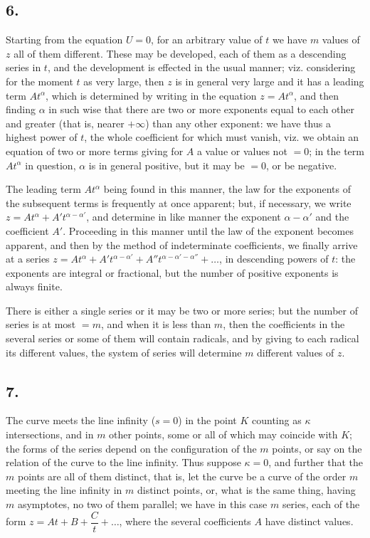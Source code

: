 \documentclass[11pt,a4paper]{book}
\begin{document}
\subsection*{6.}

Starting from the equation $U = 0$, for an arbitrary value of $t$ we have $m$ values of $z$ all of them different. These may be developed, each of them as a descending series in $t$, and the development is effected in the usual manner; viz. considering for the moment $t$ as very large, then $z$ is in general very large and it has a leading term $At^\alpha$, which is determined by writing in the equation $z = At^\alpha$, and then finding $\alpha$ in such wise that there are two or more exponents equal to each other and greater (that is, nearer $+\infty$) than any other exponent: we have thus a highest power of $t$, the whole coefficient for which must vanish, viz. we obtain an equation of two or more terms giving for $A$ a value or values not $= 0$; in the term $At^\alpha$ in question, $\alpha$ is in general positive, but it may be $= 0$, or be negative.

The leading term $At^\alpha$ being found in this manner, the law for the exponents of the subsequent terms is frequently at once apparent; but, if necessary, we write $z = At^\alpha + A' t^{\alpha - \alpha'}$, and determine in like manner the exponent $\alpha - \alpha'$ and the coefficient $A'$. Proceeding in this manner until the law of the exponent becomes apparent, and then by the method of indeterminate coefficients, we finally arrive at a series $z = At^\alpha + A' t^{\alpha - \alpha'} + A'' t^{\alpha - \alpha' - \alpha''} + \ldots$, in descending powers of $t$: the exponents are integral or fractional, but the number of positive exponents is always finite.

There is either a single series or it may be two or more series; but the number of series is at most $= m$, and when it is less than $m$, then the coefficients in the several series or some of them will contain radicals, and by giving to each radical its different values, the system of series will determine $m$ different values of $z$.

\subsection*{7.}

The curve meets the line infinity ($s = 0$) in the point $K$ counting as $\kappa$ intersections, and in $m$ other points, some or all of which may coincide with $K$; the forms of the series depend on the configuration of the $m$ points, or say on the relation of the curve to the line infinity. Thus suppose $\kappa = 0$, and further that the $m$ points are all of them distinct, that is, let the curve be a curve of the order $m$ meeting the line infinity in $m$ distinct points, or, what is the same thing, having $m$ asymptotes, no two of them parallel; we have in this case $m$ series, each of the form $z = At + B + \dfrac{C}{t} + \ldots$, where the several coefficients $A$ have distinct values.
\end{document}
